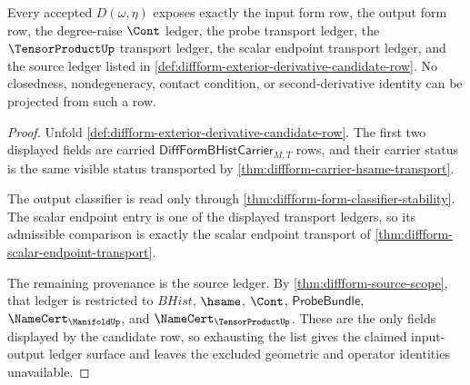 \begin{theorem}
\label{thm:diffform-exterior-derivative-input-output-ledger-exactness}
Every accepted $D(\omega,\eta)$ exposes exactly the input form row, the output
form row, the degree-raise $\Cont$ ledger, the probe transport ledger, the
$\TensorProductUp$ transport ledger, the scalar endpoint transport ledger,
and the source ledger listed in
\autoref{def:diffform-exterior-derivative-candidate-row}. No closedness,
nondegeneracy, contact condition, or second-derivative identity can be
projected from such a row.
\end{theorem}
\begin{proof}
Unfold \autoref{def:diffform-exterior-derivative-candidate-row}. The first
two displayed fields are carried $\mathsf{DiffFormBHistCarrier}_{M,T}$ rows,
and their carrier status is the same visible status transported by
\autoref{thm:diffform-carrier-hsame-transport}.

The output classifier is read only through
\autoref{thm:diffform-form-classifier-stability}. The scalar endpoint entry is
one of the displayed transport ledgers, so its admissible comparison is
exactly the scalar endpoint transport of
\autoref{thm:diffform-scalar-endpoint-transport}.

The remaining provenance is the source ledger. By
\autoref{thm:diffform-source-scope}, that ledger is restricted to $BHist$,
$\hsame$, $\Cont$, $\mathsf{ProbeBundle}$,
$\NameCert_{\ManifoldUp}$, and $\NameCert_{\TensorProductUp}$. These are the
only fields displayed by the candidate row, so exhausting the list gives the
claimed input-output ledger surface and leaves the excluded geometric and
operator identities unavailable.
\end{proof}

